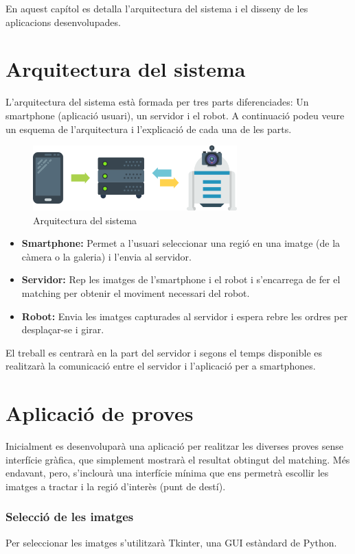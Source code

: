En aquest capítol es detalla l'arquitectura del sistema i el disseny de les aplicacions desenvolupades.
\section{Arquitectura del sistema}
	L'arquitectura del sistema està formada per tres parts diferenciades: Un smartphone (aplicació usuari), un servidor i el robot. A continuació podeu veure un esquema de l'arquitectura i l'explicació
	de cada una de les parts.\\
	\begin{figure}[H]
		\centering
		\includegraphics[width=0.7\textwidth]{images/arquitectura}
		\caption{Arquitectura del sistema}
	\end{figure}
	\vspace{0.05cm}
	\begin{itemize}
		\item{\textbf{Smartphone:} Permet a l'usuari seleccionar una regió en una imatge (de la càmera o la galeria) i l'envia al servidor.}
		\item{\textbf{Servidor:} Rep les imatges de l'smartphone i el robot i s'encarrega de fer el matching per obtenir el moviment necessari del robot.}
		\item{\textbf{Robot:} Envia les imatges capturades al servidor i espera rebre les ordres per desplaçar-se i girar.\\}
	\end{itemize}
	El treball es centrarà en la part del servidor i segons el temps disponible es realitzarà la comunicació entre el servidor i l'aplicació per a smartphones.

\section{Aplicació de proves}
	Inicialment es desenvoluparà una aplicació per realitzar les diverses proves sense interfície gràfica, que simplement mostrarà el resultat obtingut del matching. Més endavant, pero, s'inclourà una
	interfície mínima que ens permetrà escollir les imatges a tractar i la regió d'interès (punt de destí).
	\subsubsection{Selecció de les imatges}
		Per seleccionar les imatges s'utilitzarà Tkinter, una GUI estàndard de Python.

